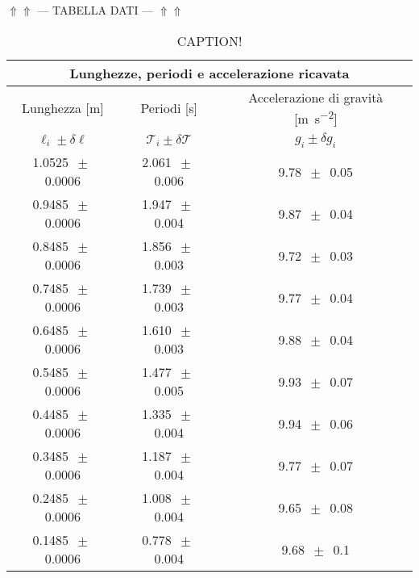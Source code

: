\begin{center}
$\Uparrow\Uparrow$ --- TABELLA DATI --- $\Uparrow\Uparrow$
\end{center}

\begin{table}
    \centering
    \begin{tabular}{c c c}
        \multicolumn{3}{c}{\textbf{Lunghezze, periodi e accelerazione ricavata}} \\
        \toprule
        Lunghezza [\si{\metre}] & Periodi [\si{\second}] & Accelerazione di gravità [\si{\metre\per\square\second}] \\
        $\ell_i \pm \delta\ell$ & $\mathcal{T}_i \pm \delta\mathcal{T}$ & $g_i \pm \delta g_i$ \\
        \midrule
1.0525 $\,\pm\,$ 0.0006 & 2.061 $\,\pm\,$ 0.006 & 9.78 $\,\pm\,$ 0.05 \\
0.9485 $\,\pm\,$ 0.0006 & 1.947 $\,\pm\,$ 0.004 & 9.87 $\,\pm\,$ 0.04 \\
0.8485 $\,\pm\,$ 0.0006 & 1.856 $\,\pm\,$ 0.003 & 9.72 $\,\pm\,$ 0.03 \\
0.7485 $\,\pm\,$ 0.0006 & 1.739 $\,\pm\,$ 0.003 & 9.77 $\,\pm\,$ 0.04 \\
0.6485 $\,\pm\,$ 0.0006 & 1.610 $\,\pm\,$ 0.003 & 9.88 $\,\pm\,$ 0.04 \\
0.5485 $\,\pm\,$ 0.0006 & 1.477 $\,\pm\,$ 0.005 & 9.93 $\,\pm\,$ 0.07 \\
0.4485 $\,\pm\,$ 0.0006 & 1.335 $\,\pm\,$ 0.004 & 9.94 $\,\pm\,$ 0.06 \\
0.3485 $\,\pm\,$ 0.0006 & 1.187 $\,\pm\,$ 0.004 & 9.77 $\,\pm\,$ 0.07 \\
0.2485 $\,\pm\,$ 0.0006 & 1.008 $\,\pm\,$ 0.004 & 9.65 $\,\pm\,$ 0.08 \\
0.1485 $\,\pm\,$ 0.0006 & 0.778 $\,\pm\,$ 0.004 & 9.68 $\,\pm\,$ 0.1 \\
        \bottomrule
    \end{tabular}
    \caption{CAPTION!}
    \label{tab:calcolo_g}
\end{table}

